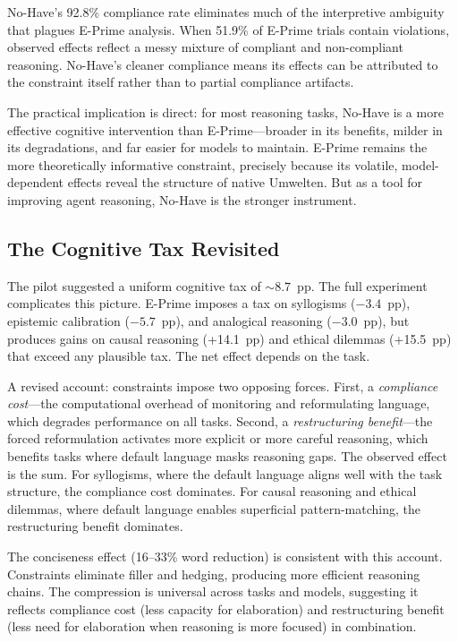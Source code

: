 \documentclass[11pt,a4paper]{article}
\begin{document}
No-Have's 92.8\% compliance rate eliminates much of the interpretive ambiguity that plagues E-Prime analysis. When 51.9\% of E-Prime trials contain violations, observed effects reflect a messy mixture of compliant and non-compliant reasoning. No-Have's cleaner compliance means its effects can be attributed to the constraint itself rather than to partial compliance artifacts.

The practical implication is direct: for most reasoning tasks, No-Have is a more effective cognitive intervention than E-Prime---broader in its benefits, milder in its degradations, and far easier for models to maintain. E-Prime remains the more theoretically informative constraint, precisely because its volatile, model-dependent effects reveal the structure of native Umwelten. But as a tool for improving agent reasoning, No-Have is the stronger instrument.

\subsection{The Cognitive Tax Revisited}

The pilot suggested a uniform cognitive tax of ${\sim}8.7$~pp. The full experiment complicates this picture. E-Prime imposes a tax on syllogisms ($-3.4$~pp), epistemic calibration ($-5.7$~pp), and analogical reasoning ($-3.0$~pp), but produces gains on causal reasoning (+14.1~pp) and ethical dilemmas (+15.5~pp) that exceed any plausible tax. The net effect depends on the task.

A revised account: constraints impose two opposing forces. First, a \emph{compliance cost}---the computational overhead of monitoring and reformulating language, which degrades performance on all tasks. Second, a \emph{restructuring benefit}---the forced reformulation activates more explicit or more careful reasoning, which benefits tasks where default language masks reasoning gaps. The observed effect is the sum. For syllogisms, where the default language aligns well with the task structure, the compliance cost dominates. For causal reasoning and ethical dilemmas, where default language enables superficial pattern-matching, the restructuring benefit dominates.

The conciseness effect (16--33\% word reduction) is consistent with this account. Constraints eliminate filler and hedging, producing more efficient reasoning chains. The compression is universal across tasks and models, suggesting it reflects compliance cost (less capacity for elaboration) and restructuring benefit (less need for elaboration when reasoning is more focused) in combination.
\end{document}
